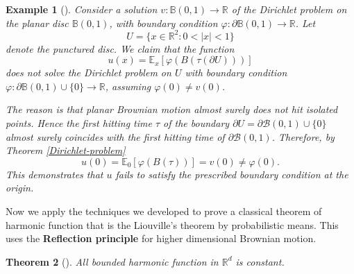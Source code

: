 \documentclass[11pt, a4paper, oneside]{report}
\numberwithin{equation}{section}
\newtheorem{theorem}{Theorem}[chapter]
\newtheorem{example}[theorem]{Example}
\begin{document}
\begin{example}
[{\cite[Example 3.15]{PeresMortersBook}}]    
Consider a solution \( v : \mathbb{B}(0,1) \to \mathbb{R} \) of the Dirichlet problem on the planar disc \( \mathbb{B}(0,1) \), with boundary condition \( \varphi : \partial \mathbb{B}(0,1) \to \mathbb{R} \). Let 
\[
U = \{ x \in \mathbb{R}^2 : 0 < |x| < 1 \}
\]
denote the punctured disc. We claim that the function
\[
u(x) = \mathbb{E}_x \left[ \varphi\left( B(\tau(\partial U)) \right) \right]
\]
does not solve the Dirichlet problem on \( U \) with boundary condition \( \varphi : \partial \mathbb{B}(0,1) \cup \{0\} \to \mathbb{R} \), assuming \( \varphi(0) \neq v(0) \). 

\noindent The reason is that planar Brownian motion almost surely does not hit isolated points. Hence the first hitting time \( \tau \) of the boundary \( \partial U = \partial \mathcal{B}(0,1) \cup \{0\} \) almost surely coincides with the first hitting time of \( \partial \mathcal{B}(0,1) \). Therefore, by Theorem \ref{Dirichlet-problem}
\[
u(0) = \mathbb{E}_0 \left[ \varphi\left( B(\tau) \right) \right] = v(0) \neq \varphi(0).
\]
This demonstrates that \( u \) fails to satisfy the prescribed boundary condition at the origin.
\end{example}
\noindent Now we apply the techniques we developed to prove a classical theorem of harmonic function that is the Liouville's theorem by probabilistic means. This uses the \textbf{Reflection principle} for higher dimensional Brownian motion.
\begin{theorem}
[{\cite[Theorem 3.16]{PeresMortersBook}}]
All bounded harmonic function in \(\mathbb{R}^d\) is constant.
\end{theorem}
\end{document}
